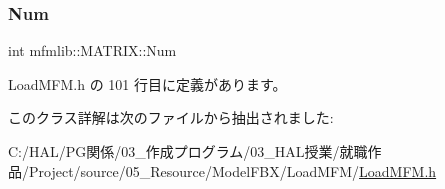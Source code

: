 \subsubsection{\texorpdfstring{Num}{Num}}
{\footnotesize\ttfamily int mfmlib\+::\+M\+A\+T\+R\+I\+X\+::\+Num}



 Load\+M\+F\+M.\+h の 101 行目に定義があります。



このクラス詳解は次のファイルから抽出されました\+:\begin{DoxyCompactItemize}
\item 
C\+:/\+H\+A\+L/\+P\+G関係/03\+\_\+作成プログラム/03\+\_\+\+H\+A\+L授業/就職作品/\+Project/source/05\+\_\+\+Resource/\+Model\+F\+B\+X/\+Load\+M\+F\+M/\mbox{\hyperlink{_load_m_f_m_8h}{Load\+M\+F\+M.\+h}}\end{DoxyCompactItemize}
